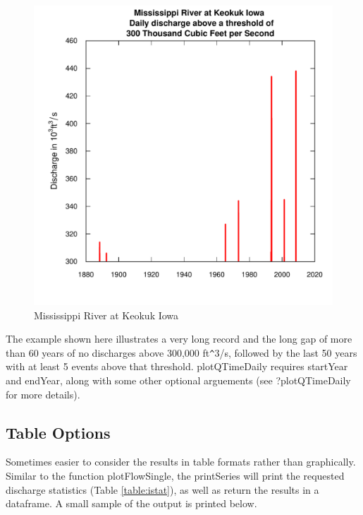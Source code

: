 \documentclass[a4paper,11pt]{article}\usepackage{graphicx, color}
\newenvironment{knitrout}{}{} %
\begin{document}
\begin{knitrout}
\begin{figure}[]
\includegraphics[width=1\linewidth,height=1\linewidth]{figure/Mississippi} \caption[Mississippi River at Keokuk Iowa]{Mississippi River at Keokuk Iowa\label{fig:Mississippi}}
\end{figure}


\end{knitrout}


The example shown here illustrates a very long record and the long gap of more than 60 years of no discharges above 300,000 ft\verb|^|3/s, followed by the last 50 years with at least 5 events above that threshold. plotQTimeDaily requires startYear and endYear, along with some other optional arguements (see ?plotQTimeDaily for more details).

\FloatBarrier

\subsection{Table Options}
\label{sec:tableOptions}
Sometimes easier to consider the results in table formats rather than graphically. Similar to the function plotFlowSingle, the printSeries will print the requested discharge statistics (Table \ref{table:istat}), as well as return the results in a dataframe. A small sample of the output is printed below.
\end{document}
